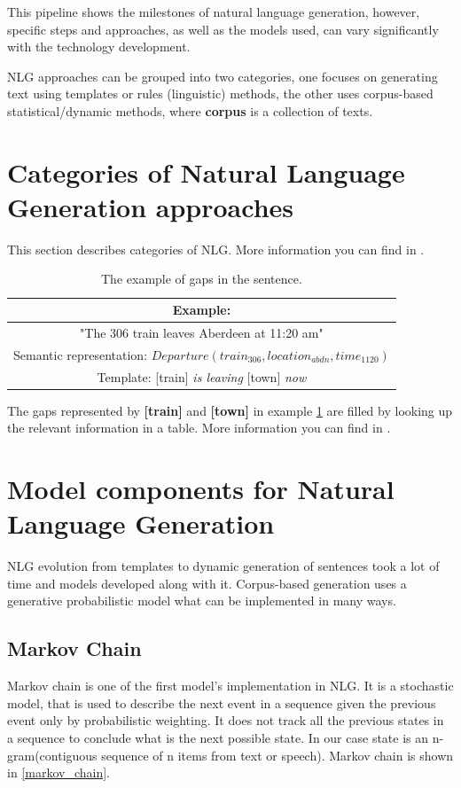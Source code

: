 This pipeline shows the milestones of natural language generation, however, specific steps and approaches, as well as the models used, can vary significantly with the technology development.

NLG approaches can be grouped into two categories, one focuses on generating text using templates or rules (linguistic) methods, the other uses corpus-based statistical/dynamic methods, where \textbf{corpus} is a collection of texts.

\section{Categories of Natural Language Generation approaches}
This section describes categories of NLG. More information you can find in \cite{rudnicky2002dialog} \cite{chen2017survey} \cite{manishina2016data}.



\begin{table}[t]
\centering
 \begin{tabular}{|c|} 
 \hline
 Example: \\
 \hline
 "The 306 train leaves Aberdeen at 11:20 am" \\ 
 \hline
 Semantic representation: 
 $Departure(train_{306}, location_{abdn}, time_{1120})$ \\
 \hline
 Template: 
 [train] \textit{is leaving} [town] \textit{now} \\
 \hline
 \end{tabular}
 \caption{The example of gaps in the sentence.}
\label{tab:tb_example}
\end{table}

The gaps represented by \textbf{[train]} and \textbf{[town]} in example \ref{tab:tb_example} are filled by looking up the relevant
information in a table. More information you can find in \cite{applied_nlg}.


\section{Model components for Natural Language Generation}
NLG evolution from templates to dynamic generation of sentences took a lot of time and models developed along with it. Corpus-based generation uses a generative probabilistic model what can be implemented in many ways.

\subsection{Markov Chain}
Markov chain is one of the first model's implementation in NLG. It is a stochastic model, that is used to describe the next event in a sequence given the previous event only by probabilistic weighting. It does not track all the previous states in a sequence to conclude what is the next possible state. In our case state is an n-gram(contiguous sequence of n items from text or speech). Markov chain is shown in \ref{markov_chain}.

